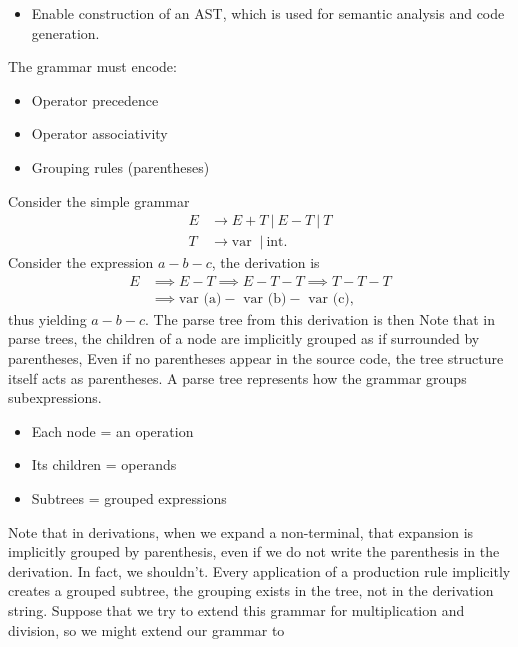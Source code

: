 \documentclass{report}
\begin{document}
\begin{itemize}
\begin{itemize}
                \item Enable construction of an AST, which is used for semantic analysis and code generation.
            \end{itemize}
            The grammar must encode:
            \begin{itemize}
                \item Operator precedence
                \item Operator associativity
                \item Grouping rules (parentheses)
            \end{itemize}
            Consider the simple grammar
            \begin{align*}
                E &\to E + T\ |\ E - T \ |\ T \\
                T &\to \text{var }\ | \ \text{int}
            .\end{align*}
            Consider the expression $a - b - c$, the derivation is
            \begin{align*}
                E &\implies E - T \implies E - T - T \implies T - T - T \\
                  &\implies \text{var (a)} - \text{ var (b)} - \text{ var (c)}
            ,\end{align*}
            thus yielding $a - b  - c$. The parse tree from this derivation is then
            \bigbreak \noindent 
            \bigbreak \noindent 
            Note that in parse trees, the children of a node are implicitly grouped as if surrounded by parentheses, Even if no parentheses appear in the source code, the tree structure itself acts as parentheses. A parse tree represents how the grammar groups subexpressions.
            \begin{itemize}
                \item Each node = an operation
                \item Its children = operands
                \item Subtrees = grouped expressions
            \end{itemize}
            Note that in derivations, when we expand a non-terminal, that expansion is implicitly grouped by parenthesis, even if we do not write the parenthesis in the derivation. In fact, we shouldn't. Every application of a production rule implicitly creates a grouped subtree, the grouping exists in the tree, not in the derivation string.
            \bigbreak \noindent 
            Suppose that we try to extend this grammar for multiplication and division, so we might extend our grammar to

\end{itemize}
\end{document}

